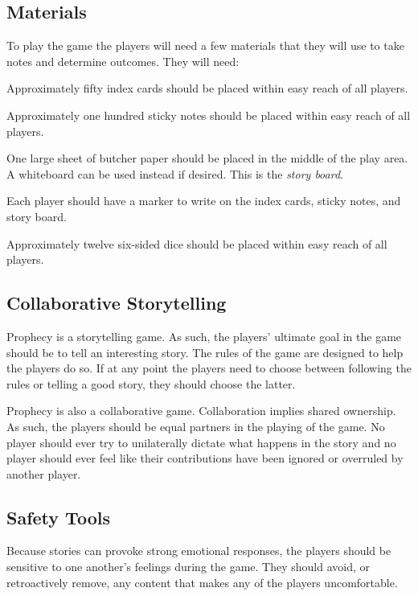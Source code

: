 \documentclass[12pt, a5paper, parskip=half-, footheight=1.4cm]{scrartcl}
\begin{document}
\subsection*{Materials} \label{subsection:materials}
To play the game the players will need a few materials that they will use to take notes and determine outcomes. They will need:
\begin{description}[labelindent=0.25cm, leftmargin=\widthof{\hspace{0.25cm}\textbullet\space}, font=\normalfont\textbullet\bfseries\space]
	\item[Index Cards:] Approximately fifty index cards should be placed within easy reach of all players. 
	\item[Sticky Notes:] Approximately one hundred sticky notes should be placed within easy reach of all players.
	\item[Butcher Paper:] One large sheet of butcher paper should be placed in the middle of the play area.  A whiteboard can be used instead if desired. This is the \emph{story board}. 
	\item[Markers:] Each player should have a marker to write on the index cards, sticky notes, and story board.
	\item[Dice:] Approximately twelve six-sided dice should be placed within easy reach of all players. 
\end{description}

\newpage

\subsection*{Collaborative Storytelling} \label{subsection:collaborative-storytelling}
Prophecy is a storytelling game.
As such, the players' ultimate goal in the game should be to tell an interesting story.
The rules of the game are designed to help the players do so.
If at any point the players need to choose between following the rules or telling a good story, they should choose the latter.

Prophecy is also a collaborative game.
Collaboration implies shared ownership.
As such, the players should be equal partners in the playing of the game.
No player should ever try to unilaterally dictate what happens in the story and no player should ever feel like their contributions have been ignored or overruled by another player.

\subsection*{Safety Tools} \label{subsection:safety-tools}
Because stories can provoke strong emotional responses, the players should be sensitive to one another's feelings during the game.
They should avoid, or retroactively remove, any content that makes any of the players uncomfortable.
\end{document}
